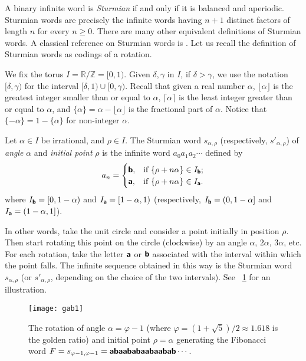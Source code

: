 \documentclass[11pt,reqno]{amsart}
\numberwithin{equation}{section}
\theoremstyle{plain}
\theoremstyle{definition}
\theoremstyle{remark}
\renewcommand{\phi}{\varphi}
\def\cd3#1{\textbf{\textsf{#1}}}
\def\sa#1{\cd3{#1}}
\begin{document}
A binary infinite word is \emph{Sturmian} if and only if it is balanced and aperiodic. Sturmian words are precisely the infinite words having $n+1$ distinct factors of length $n$ for every $n\geq 0$. There are many other equivalent definitions of Sturmian words. A classical reference on Sturmian words is \cite[Chapter 2]{LothAlg}. Let us recall the definition of Sturmian words as codings of a rotation.

We fix the torus $I=\mathbb{R}/\mathbb{Z}=[0,1)$. Given $\delta,\gamma$ in $I$, if $\delta > \gamma$, we use the notation $[\delta,\gamma)$ for the interval $[\delta,1)\cup [0,\gamma)$. Recall that given a real number $\alpha$,  $\lfloor \alpha \rfloor$ is the greatest integer smaller than or equal to $\alpha$, $\lceil \alpha \rceil$ is the least integer greater than or equal to $\alpha$, and $\{\alpha\}=\alpha-\lfloor \alpha \rfloor$ is the fractional part of  $\alpha$. 
Notice that $\{-\alpha\}= 1-\{\alpha\}$ for non-integer $\alpha$. 

Let $\alpha\in I$ be irrational, and $\rho\in I$. 
The Sturmian word $s_{\alpha,\rho}$ (respectively, $s'_{\alpha,\rho}$) of  \emph{angle} $\alpha$ and \emph{initial point} $\rho$ is the infinite word $a_{0}a_{1}a_{2}\cdots$ defined by
$$a_{n} =
\begin{cases}
		\sa{b},  & \text {if } \{ \rho + n\alpha \}\in I_{\sa{b}};\\
		\sa{a},  & \text{if } \{ \rho + n\alpha \}\in I_{\sa{a}}.
\end{cases}
$$
where $I_{\sa{b}}=[0,1-\alpha)$ and $I_{\sa{a}}=[1-\alpha,1)$   (respectively,
$I_{\sa{b}}=(0,1-\alpha]$ and $I_{\sa{a}}=(1-\alpha,1]$).

In other words, take the unit circle and consider a point initially in position $\rho$. Then start rotating this point on the circle (clockwise) by an angle $\alpha$, $2\alpha$, $3\alpha$, etc. For each rotation, take the letter $\sa{a}$ or $\sa{b}$ associated with the interval within which the point falls. The infinite sequence obtained in this way is the Sturmian word $s_{\alpha,\rho}$ (or $s'_{\alpha,\rho}$, depending on the choice of the two intervals). See \figurename~\ref{Fig:gab1} for an illustration.

\begin{figure}[!ht]
\centering
\texttt{[image: gab1]} 
\caption{The rotation of angle $\alpha=\phi-1$ (where $\phi=(1+\sqrt 5 )/2\approx 1.618$ is the golden ratio) and initial point $\rho=\alpha$ generating the Fibonacci word $F=s_{\phi-1,\phi-1}=\sa{abaababaabaabab}\cdots$. \label{Fig:gab1}}
\end{figure}
\end{document}
